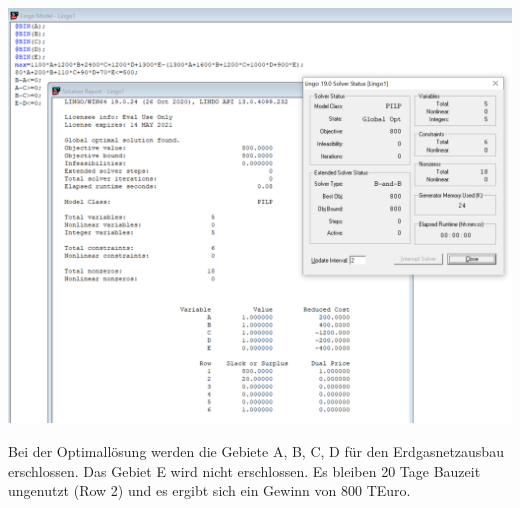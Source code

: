 \documentclass[a4paper,11pt]{article}
\begin{document}
\begin{centering}
	\includegraphics[width=1\linewidth]{src/blatt_6_aufgabe_3_solverloesung.png}
\end{centering}

\vspace{6mm}

Bei der Optimallösung werden die Gebiete A, B, C, D für den Erdgasnetzausbau erschlossen. Das Gebiet E wird nicht erschlossen. Es bleiben 20 Tage Bauzeit ungenutzt (Row 2) und es ergibt sich ein Gewinn von 800 TEuro.
\end{document}
